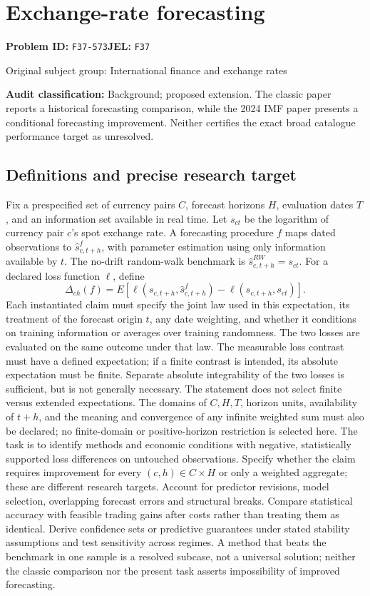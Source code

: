 \documentclass[11pt,a4paper]{article}
\begin{document}
\section*{Exchange-rate forecasting}
\textbf{Problem ID:} \texttt{F37-573}\quad \textbf{JEL:} \texttt{F37}\par
\label{problem:OP-0330}
{\sffamily\small\color{muted}Original subject group: International finance and exchange rates\par}
\label{definitions:problem:30007612}
\textbf{Audit classification:} Background; proposed extension. The classic paper reports a historical forecasting comparison, while the 2024 IMF paper presents a conditional forecasting improvement. Neither certifies the exact broad catalogue performance target as unresolved.
\subsection*{Definitions and precise research target}
Fix a prespecified set of currency pairs \(C\), forecast horizons \(H\), evaluation dates \(T\), and an information set available in real time. Let \(s_{ct}\) be the logarithm of currency pair \(c\)'s spot exchange rate. A forecasting procedure \(f\) maps dated observations to \(\widehat s^f_{c,t+h}\), with parameter estimation using only information available by \(t\). The no-drift random-walk benchmark is \(\widehat s^{RW}_{c,t+h}=s_{ct}\). For a declared loss function \(\ell\), define
\[\Delta_{ch}(f)=E[\ell(s_{c,t+h},\widehat s^f_{c,t+h})-\ell(s_{c,t+h},s_{ct})].\]
Each instantiated claim must specify the joint law used in this expectation, its treatment of the forecast origin \(t\), any date weighting, and whether it conditions on training information or averages over training randomness. The two losses are evaluated on the same outcome under that law. The measurable loss contrast must have a defined expectation; if a finite contrast is intended, its absolute expectation must be finite. Separate absolute integrability of the two losses is sufficient, but is not generally necessary. The statement does not select finite versus extended expectations. The domains of \(C,H,T\), horizon units, availability of \(t+h\), and the meaning and convergence of any infinite weighted sum must also be declared; no finite-domain or positive-horizon restriction is selected here.
The task is to identify methods and economic conditions with negative, statistically supported loss differences on untouched observations. Specify whether the claim requires improvement for every \((c,h)\in C\times H\) or only a weighted aggregate; these are different research targets. Account for predictor revisions, model selection, overlapping forecast errors and structural breaks. Compare statistical accuracy with feasible trading gains after costs rather than treating them as identical. Derive confidence sets or predictive guarantees under stated stability assumptions and test sensitivity across regimes. A method that beats the benchmark in one sample is a resolved subcase, not a universal solution; neither the classic comparison nor the present task asserts impossibility of improved forecasting.
\end{document}
